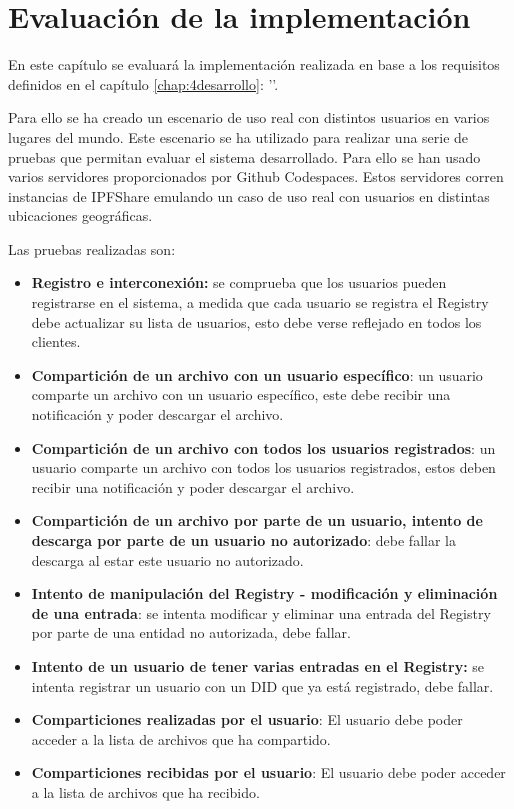\chapter{Evaluación de la implementación}\label{chap:5evaluacion}

En este capítulo se evaluará la implementación realizada en base a los requisitos definidos en el capítulo \ref{chap:4desarrollo}: ''.

Para ello se ha creado un escenario de uso real con distintos usuarios en varios lugares del mundo. Este escenario se ha utilizado para realizar una serie de pruebas que permitan evaluar el sistema desarrollado. Para ello se han usado varios servidores proporcionados por Github Codespaces.
Estos servidores corren instancias de IPFShare emulando un caso de uso real con usuarios en distintas ubicaciones geográficas.

Las pruebas realizadas son:
\begin{itemize}[noitemsep,after=\vspace{-0.4\baselineskip}]
    \item \textbf{Registro e interconexión:} se comprueba que los usuarios pueden registrarse en el sistema, a medida que cada usuario se registra
          el Registry debe actualizar su lista de usuarios, esto debe verse reflejado en todos los clientes.
    \item \textbf{Compartición de un archivo con un usuario específico}: un usuario comparte un archivo con un usuario específico, este debe recibir
          una notificación y poder descargar el archivo.
    \item \textbf{Compartición de un archivo con todos los usuarios registrados}: un usuario comparte un archivo con todos los usuarios registrados,
          estos deben recibir una notificación y poder descargar el archivo.
    \item \textbf{Compartición de un archivo por parte de un usuario, intento de descarga por parte de un usuario no autorizado}: debe fallar la descarga al estar este usuario no autorizado.
    \item \textbf{Intento de manipulación del Registry - modificación y eliminación de una entrada}: se intenta modificar y eliminar una entrada del Registry por parte de una entidad no autorizada, debe fallar.
    \item \textbf{Intento de un usuario de tener varias entradas en el Registry:} se intenta registrar un usuario con un DID que ya está registrado, debe
          fallar.
    \item \textbf{Comparticiones realizadas por el usuario}: El usuario debe poder acceder a la lista de archivos que ha compartido.
    \item \textbf{Comparticiones recibidas por el usuario}: El usuario debe poder acceder a la lista de archivos que ha recibido.
\end{itemize}

